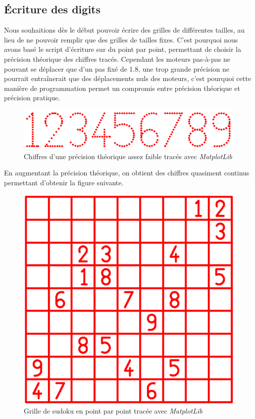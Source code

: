 \documentclass[12pt,a4paper]{report}
\begin{document}
\subsection{Écriture des digits}
Nous souhaitions dès le début pouvoir écrire des grilles de différentes tailles, au lieu de ne pouvoir remplir que des grilles de tailles fixes. C'est pourquoi nous avons basé le script d'écriture sur du point par point, permettant de choisir la précision théorique des chiffres tracés. Cependant les moteurs pas-à-pas ne pouvant se déplacer que d'un pas fixé de 1.8\degre, une trop grande précision ne pourrait entraînerait que des déplacements nuls des moteurs, c'est pourquoi cette manière de programmation permet un compromis entre précision théorique et précision pratique.
\begin{figure}[!h]
 \center
 \includegraphics[scale=0.35]{../pictures/numbers}
 \caption{Chiffres d'une précision théorique assez faible tracés avec \emph{MatplotLib}}
\end{figure}

En augmentant la précision théorique, on obtient des chiffres quasiment continus permettant d'obtenir la figure suivante.

\begin{figure}[!h]
 \center
 \includegraphics[scale=0.5]{../pictures/Sudoku_points}
 \caption{Grille de sudoku en point par point tracée avec \emph{MatplotLib}}
\end{figure}
\end{document}

